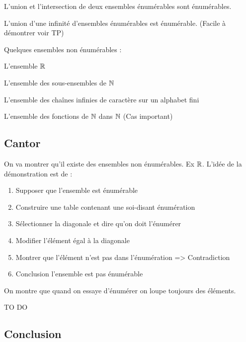 \begin{myprop}
L'union et l'intersection de deux ensembles énumérables sont énumérables.
\end{myprop}

\begin{myprop}
L'union d'une infinité d'ensembles énumérables est énumérable. (Facile à
		démontrer voir TP)
\end{myprop}

Quelques ensembles non énumérables : 
\begin{myexem}
 L'ensemble $\mathbb{R}$
\end{myexem}

\begin{myexem}
 L'ensemble des sous-ensembles de $\mathbb{N}$
\end{myexem}

\begin{myexem}
 L'ensemble des chaînes infinies de caractère sur un alphabet fini
\end{myexem}

\begin{myexem}
 L'ensemble des fonctions de $\mathbb{N}$ dans $\mathbb{N}$ (Cas important)
\end{myexem}


\subsection{Cantor}
\label{sub:cantor}
On va montrer qu'il existe des ensembles non énumérables. Ex $\mathbb{R}$.
L'idée de la démonstration est de :
\begin{enumerate}
	\item Supposer que l'ensemble est énumérable
 	\item Construire une table contenant une soi-disant énumération
	\item Sélectionner la diagonale et dire qu'on doit l'énumérer
	\item Modifier l'élément égal à la diagonale
	\item Montrer que l'élément n'est pas dans l'énumération => Contradiction
	\item Conclusion l'ensemble est pas énumérable
\end{enumerate}
On montre que quand on essaye d'énumérer on loupe toujours des éléments.

TO DO


\subsection{Conclusion}

